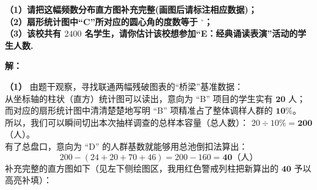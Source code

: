 \textbf{（1）请把这幅频数分布直方图补充完整(画图后请标注相应数据)；\\
（2）扇形统计图中“C”所对应的圆心角的度数等于 \underline{\makebox[1.5cm]{}}$^\circ$；\\
（3）该校共有 $2400$ 名学生，请你估计该校想参加“E：经典诵读表演”活动的学生人数.}

\vspace{0.4cm}
\textbf{解：}

\textbf{（1）} 由题干观察，寻找联通两幅残破图表的“桥梁”基准数据：\\
从坐标轴的柱状（直方）统计图可以读出，意向为 “B” 项目的学生实有 $\boldsymbol{20}$ 人；而对应的扇形统计图中清清楚楚地写明 “B” 项精准占了整体调样人群的 $\boldsymbol{10\%}$。\\
所以，我们可以瞬间切出本次抽样调查的总样本容量（总人数）： $20 \div 10\% = \boldsymbol{200}$（人）。\\
有了总盘口，意向为 “D” 的人群基数就能够用总池倒扣法算出：
$$200 - (24 + 20 + 70 + 46) = 200 - 160 = \boldsymbol{40}\text{（人）}$$
补充完整的直方图如下（见左下侧绘图区，我用红色警戒列柱把新算出的 $\boldsymbol{40}$ 予以高亮补填）：

\vspace{0.4cm}

